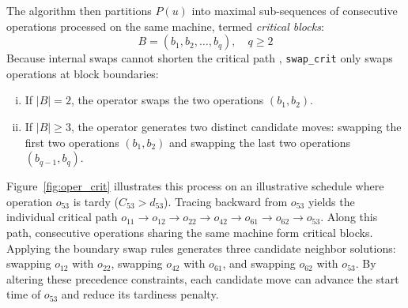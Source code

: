 The algorithm then partitions $P(u)$ into maximal sub-sequences of consecutive operations processed on the same machine, termed \emph{critical blocks}:
\begin{equation}
B = (b_1, b_2, \ldots, b_q), \quad q \ge 2
\end{equation}
Because internal swaps cannot shorten the critical path \citep{nowicki1996fast}, \texttt{swap\_crit} only swaps operations at block boundaries:
\begin{enumerate}[(i)]
    \item If $|B| = 2$, the operator swaps the two operations $(b_1, b_2)$.
    \item If $|B| \ge 3$, the operator generates two distinct candidate moves: swapping the first two operations $(b_1, b_2)$ and swapping the last two operations $(b_{q-1}, b_q)$.
\end{enumerate}

Figure~\ref{fig:oper_crit} illustrates this process on an illustrative schedule where operation $o_{53}$ is tardy ($C_{53} > d_{53}$).
Tracing backward from $o_{53}$ yields the individual critical path $o_{11} \to o_{12} \to o_{22} \to o_{42} \to o_{61} \to o_{62} \to o_{53}$.
Along this path, consecutive operations sharing the same machine form critical blocks.
Applying the boundary swap rules generates three candidate neighbor solutions: swapping $o_{12}$ with $o_{22}$, swapping $o_{42}$ with $o_{61}$, and swapping $o_{62}$ with $o_{53}$.
By altering these precedence constraints, each candidate move can advance the start time of $o_{53}$ and reduce its tardiness penalty.

